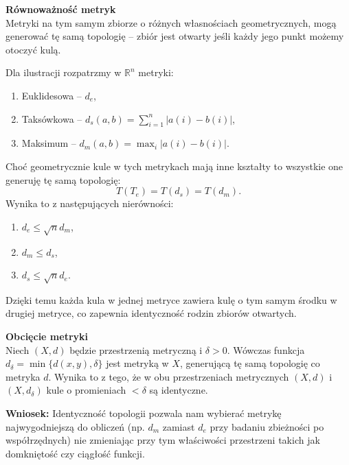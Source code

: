 \begin{eg}[1.1.6]
\noindent \textbf{Równoważność metryk} \\
	Metryki na tym samym zbiorze o różnych własnościach geometrycznych, mogą generować tę samą topologię -- zbiór jest otwarty jeśli każdy jego punkt możemy otoczyć kulą.

	Dla ilustracji rozpatrzmy w $\mathbb{R}^{n}$ metryki:
	\begin{enumerate}[label=\arabic*)]
		\item Euklidesowa -- $d_{e}$,
		\item Taksówkowa -- $d_{s}\left( a,b \right) = \sum_{i = 1}^{n} \left| a\left( i \right) - b\left( i \right)  \right|$,
		\item Maksimum -- $d_{m}\left( a,b \right) = \max_{i}\left| a\left( i \right) - b\left( i \right)  \right| $.
	\end{enumerate}

Choć geometrycznie kule w tych metrykach mają inne kształty to wszystkie one generuję tę samą topologię: 
 \[
T\left( T_{e} \right) = T\left( d_{s} \right) = T\left( d_{m} \right) 
.\] 
Wynika to z następujących nierówności:
\begin{enumerate}[label=\arabic*)]
	\item $d_{e} \le \sqrt{n} d_{m}$,
	\item $d_{m} \le d_{s}$,
	\item $d_{s}\le \sqrt{n} d_{e}$.
\end{enumerate}
Dzięki temu każda kula w jednej metryce zawiera kulę o tym samym środku w drugiej metryce, co zapewnia identyczność rodzin zbiorów otwartych.

\noindent \textbf{Obcięcie metryki}\\
Niech $\left( X,d \right) $ będzie przestrzenią metryczną i $\delta > 0$. Wówczas funkcja $d_{\delta} = \min \{d\left( x,y \right), \delta\} $ jest metryką w $X$, generującą tę samą topologię co metryka $d$. Wynika to z tego, że w obu przestrzeniach metrycznych $\left( X,d \right) $ i $\left( X, d_{\delta} \right) $ kule o promieniach $< \delta$ są identyczne. 

\noindent \textbf{Wniosek:} Identyczność topologii pozwala nam wybierać metrykę najwygodniejszą do obliczeń (np. $d_{m}$ zamiast $d_{e}$ przy badaniu zbieżności po współrzędnych) nie zmieniając przy tym właściwości przestrzeni takich jak domkniętość czy ciągłość funkcji.
\end{eg}

